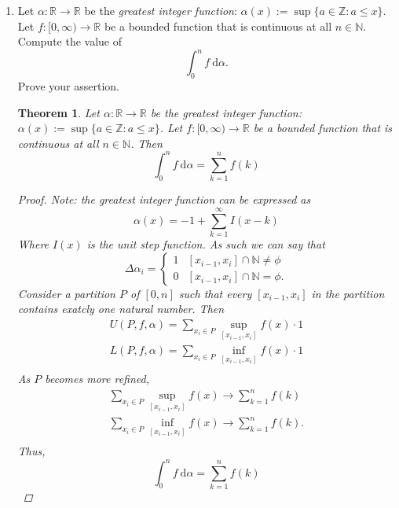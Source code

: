 \documentclass{amsart}
\newtheorem{theorem}{Theorem}
\begin{document}
\begin{enumerate}[1.]
    
    \newpage
    \item Let $\alpha: \mathbb{R} \to \mathbb{R}$ be the \emph{greatest integer function}: $\alpha(x):= \sup \{ a \in \mathbb{Z}: a \leq x\}$. Let $f:[0,\infty) \to \mathbb{R}$ be a bounded function that is continuous at all $n \in \mathbb{N}$. Compute the value of
    \[ \int_0^n f\ \mathrm{d}\alpha.\]
    Prove your assertion.
    \begin{theorem}
        Let $\alpha: \mathbb{R} \to \mathbb{R}$ be the \emph{greatest integer function}: $\alpha(x):= \sup \{ a \in \mathbb{Z}: a \leq x\}$. Let $f:[0,\infty) \to \mathbb{R}$ be a bounded function that is continuous at all $n \in \mathbb{N}$. Then 
        \[
            \int_0^n f\ \mathrm{d}\alpha = \sum_{k = 1}^{n} f(k)
        \]
        \begin{proof}
            Note: the greatest integer function can be expressed as
            \[
                \alpha(x) = -1 + \sum_{k = 1}^\infty I(x - k)    
            \]
            Where $I(x)$ is the unit step function. As such we can say that 
            \[ \Delta \alpha_i = \begin{cases} 1 & [x_{i-1}, x_i] \cap \mathbb{N} \neq \phi \\
                0 & [x_{i-1}, x_i] \cap \mathbb{N} = \phi.
                \end{cases}\]
            Consider a partition $P$ of $[0,n]$ such that every $[x_{i-1}, x_i]$ in the partition contains
            exatcly one natural number.
            Then 
            \begin{align*}
                U(P,f,\alpha) = \sum_{x_i\in P} \sup_{[x_{i-1}, x_i]} f(x) \cdot 1 \\
                L(P,f,\alpha) = \sum_{x_i\in P} \inf_{[x_{i-1}, x_i]} f(x) \cdot 1 \\
            \end{align*}
            As $P$ becomes more refined, 
            \begin{align*}
                \sum_{x_i\in P} \sup_{[x_{i-1}, x_i]} f(x) \to \sum_{k=1}^n f(k) \\ 
                \sum_{x_i\in P} \inf_{[x_{i-1}, x_i]} f(x) \to \sum_{k=1}^n f(k). \\
            \end{align*}
            Thus,
            \[
                \int_0^n f\ \mathrm{d}\alpha = \sum_{k = 1}^{n} f(k)    
            \]
        \end{proof}
    \end{theorem}


\end{enumerate}
\end{document}
